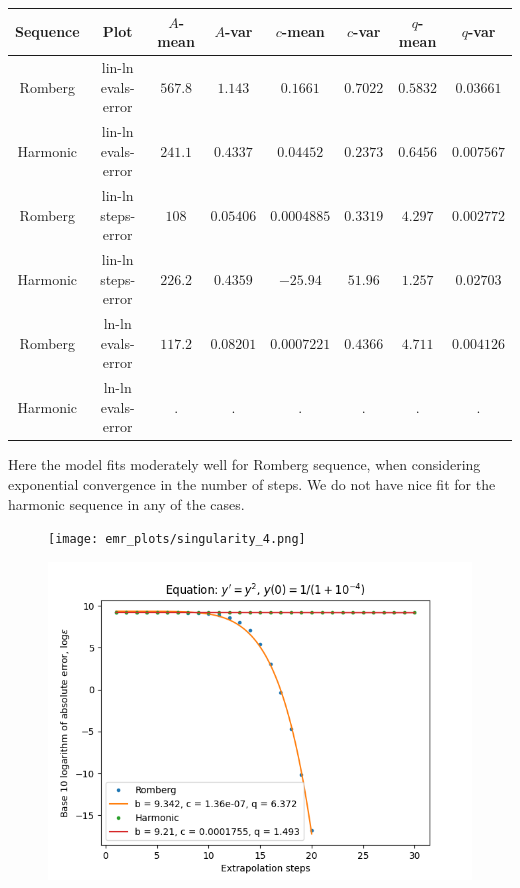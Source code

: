 \begin{table}[H]
    \centering
    \small
     \begin{tabular}{c|c||c|c|c|c|c|c}
Sequence & Plot & \(A\)-mean & \(A\)-var & \(c\)-mean & \(c\)-var & \(q\)-mean & \(q\)-var\\\hline
Romberg & lin-ln evals-error & \(567.8\) & \(1.143\) & \(0.1661\) & \(0.7022\) & \(0.5832\) & \(0.03661\) \\
Harmonic & lin-ln evals-error & \(241.1\) & \(0.4337\) & \(0.04452\) & \(0.2373\) & \(0.6456\) & \(0.007567\) \\
Romberg & lin-ln steps-error & \(108\) & \(0.05406\) & \(0.0004885\) & \(0.3319\) & \(4.297\) & \(0.002772\) \\
Harmonic & lin-ln steps-error & \(226.2\) & \(0.4359\) & \(-25.94\) & \(51.96\) & \(1.257\) & \(0.02703\) \\
Romberg & ln-ln evals-error & \(117.2\) & \(0.08201\) & \(0.0007221\) & \(0.4366\) & \(4.711\) & \(0.004126\) \\
Harmonic & ln-ln evals-error & . & . & . & . & . & . \\
    \end{tabular}
    \label{tab:my_label}
\end{table}

Here the model fits moderately well for Romberg sequence, when considering exponential convergence in the number of steps. We do not have nice fit for the harmonic sequence in any of the cases.

\begin{figure}[H]
\centering
\begin{minipage}{0.45\textwidth}
\centering
\texttt{[image: emr\_plots/singularity\_4.png]}
\end{minipage}
\begin{minipage}{0.45\textwidth}
\centering
\includegraphics[scale=0.45]{emr_plots/singularity_4_hp_steps.png}
\end{minipage}
\end{figure}

